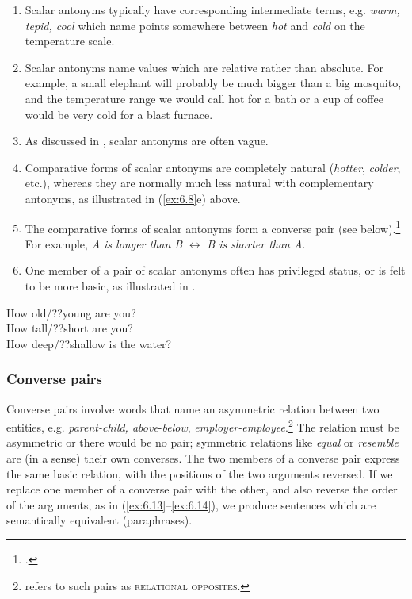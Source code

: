 \begin{enumerate}[label=\alph*.]
\item Scalar antonyms typically have corresponding intermediate terms, e.g. \textit{warm, tepid, cool} which name points somewhere between \textit{hot} and \textit{cold} on the temperature scale.
\item Scalar antonyms name values which are relative rather than absolute. For example, a small elephant will probably be much bigger than a big mosquito, and the temperature range we would call hot for a bath or a cup of coffee would be very cold for a blast furnace.
\item As discussed in , scalar antonyms are often vague.
\item Comparative forms of scalar antonyms are completely natural (\textit{hotter}, \textit{colder}, etc.), whereas they are normally much less natural with complementary antonyms, as illustrated in (\ref{ex:6.8}e) above.
\item The comparative forms of scalar antonyms form a converse pair (see below).\footnote{\citet[232]{Cruse1986}.} For example, \textit{A is longer than B}  $\leftrightarrow $  \textit{B is shorter than A}.
\item One member of a pair of scalar antonyms often has privileged status, or is felt to be more basic, as illustrated in .
\end{enumerate}

\ea \label{ex:6.12}
\ea How old/??young are you?\\
\ex How tall/??short are you?\\
\ex How deep/??shallow is the water?
                       \z
\z

\subsubsection{Converse pairs}\label{sec:6.2.2.3}

Converse pairs involve words that name an asymmetric relation between two entities, e.g. \textit{parent-child, above}-\textit{below}, \textit{employer-employee}.\footnote{\citet[231]{Cruse1986} refers to such pairs as \textsc{relational} \textsc{opposites}.} The relation must be asymmetric or there would be no pair; symmetric relations like \textit{equal} or \textit{resemble} are (in a sense) their own converses. The two members of a converse pair express the same basic relation, with the positions of the two arguments reversed. If we replace one member of a converse pair with the other, and also reverse the order of the arguments, as in (\ref{ex:6.13}--\ref{ex:6.14}), we produce sentences which are semantically equivalent (paraphrases).


